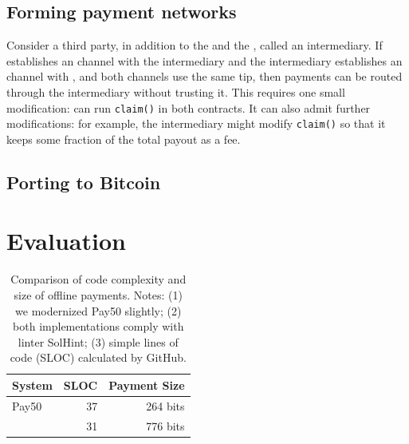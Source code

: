 \subsection{Forming payment networks} 

Consider a third party, in addition to the \make and the \take, called an intermediary. If \make establishes an \ew channel with the intermediary and the intermediary establishes an \ew channel with \take, and both channels use the same tip, then payments can be routed through the intermediary without trusting it. This requires one small modification: \take can run \texttt{claim()} in both contracts. It can also admit further modifications: for example, the intermediary might modify \texttt{claim()} so that it keeps some fraction of the total payout as a fee.

\subsection{Porting to Bitcoin}






\section{Evaluation}

\begin{table}[t]          
\centering
\begin{tabular}{ l | r | r }
System 		& SLOC 	& Payment Size 	  \\ \hline
\textsf{Pay50} 	& 37  	& 264 bits  		  \\
\eww 		& 31		& 776 bits  		  \\ 
\end{tabular}
\caption{Comparison of code complexity and size of offline payments. Notes: (1) we modernized \textsf{Pay50} slightly; (2) both implementations comply with linter SolHint; (3) simple lines of code (SLOC) calculated by GitHub.\label{table:loc}}
\end{table}

